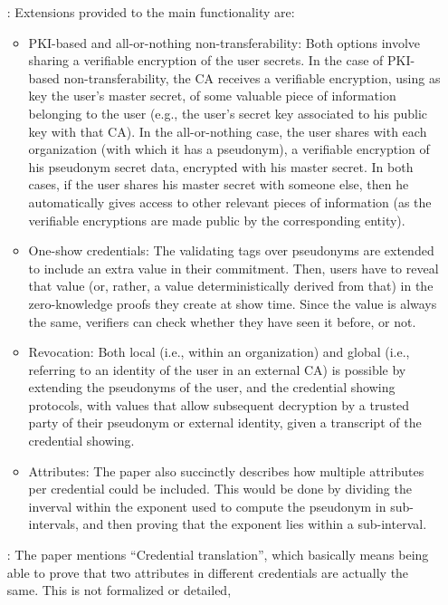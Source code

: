 \begin{enumerate}
\item[\cite{cl01}:] Extensions provided to the main functionality are:
  \begin{itemize}
  \item PKI-based and all-or-nothing non-transferability: Both options
    involve sharing a verifiable encryption of the user secrets. In the
    case of PKI-based non-transferability, the CA receives a verifiable
    encryption, using as key the user's master secret, of some valuable
    piece of information belonging to the user (e.g., the user's secret
    key associated to his public key with that CA). In the all-or-nothing
    case, the user shares with each organization (with which it has a
    pseudonym), a verifiable encryption of his pseudonym secret data, encrypted
    with his master secret. In both cases, if the user shares his master
    secret with someone else, then he automatically gives access to
    other relevant pieces of information (as the verifiable encryptions are
    made public by the corresponding entity).    
  \item One-show credentials: The validating tags over pseudonyms are extended
    to include an extra value in their commitment. Then, users have to reveal
    that value (or, rather, a value deterministically derived from that) in the
    zero-knowledge proofs they create at show time. Since the value is always
    the same, verifiers can check whether they have seen it before, or not.
  \item Revocation: Both local (i.e., within an organization) and global (i.e.,
    referring to an identity of the user in an external CA) is possible by
    extending the pseudonyms of the user, and the credential showing protocols,
    with values that allow subsequent decryption by a trusted party of their
    pseudonym or external identity, given a transcript of the credential
    showing.    
  \item Attributes: The paper also succinctly describes how multiple attributes
    per credential could be included. This would be done by dividing the inverval
    within the exponent used to compute the pseudonym in sub-intervals, and then
    proving that the exponent lies within a sub-interval.
  \end{itemize}
\item[\cite{cmz14}:] The paper mentions ``Credential translation'', which
  basically means being able to prove that two attributes in different
  credentials are actually the same. This is not formalized or detailed,

\end{enumerate}

